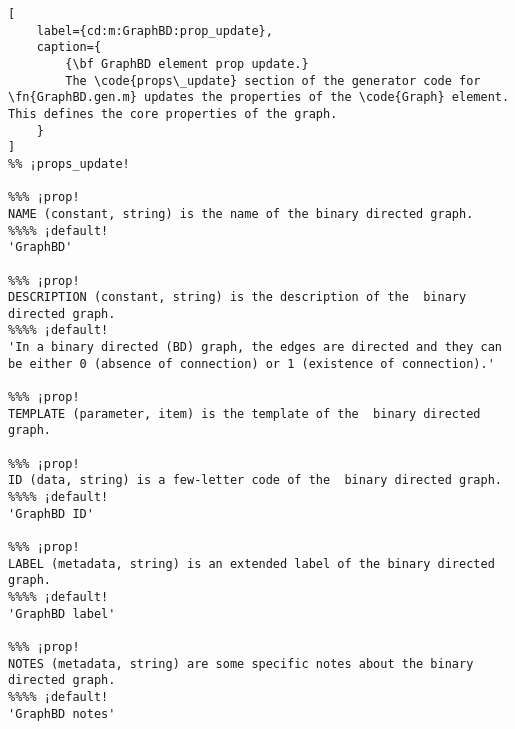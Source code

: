 \documentclass{tufte-handout}
\begin{document}
\begin{lstlisting}[
	label={cd:m:GraphBD:prop_update},
	caption={
		{\bf GraphBD element prop update.}
		The \code{props\_update} section of the generator code for \fn{GraphBD.gen.m} updates the properties of the \code{Graph} element. This defines the core properties of the graph.
	}
]
%% ¡props_update!

%%% ¡prop!
NAME (constant, string) is the name of the binary directed graph.
%%%% ¡default!
'GraphBD'

%%% ¡prop!
DESCRIPTION (constant, string) is the description of the  binary directed graph.
%%%% ¡default!
'In a binary directed (BD) graph, the edges are directed and they can be either 0 (absence of connection) or 1 (existence of connection).'

%%% ¡prop!
TEMPLATE (parameter, item) is the template of the  binary directed graph.

%%% ¡prop!
ID (data, string) is a few-letter code of the  binary directed graph.
%%%% ¡default!
'GraphBD ID'

%%% ¡prop!
LABEL (metadata, string) is an extended label of the binary directed graph.
%%%% ¡default!
'GraphBD label'

%%% ¡prop!
NOTES (metadata, string) are some specific notes about the binary directed graph.
%%%% ¡default!
'GraphBD notes'


\end{lstlisting}
\end{document}

